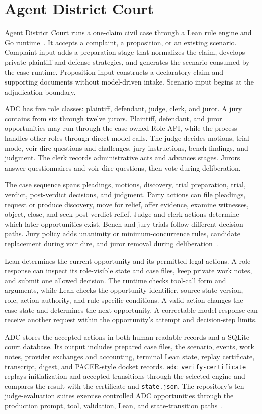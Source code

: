 \documentclass[11pt]{article}
\newcommand{\code}[1]{\texttt{#1}}
\begin{document}
\section{Agent District Court}

Agent District Court runs a one-claim civil case through a Lean rule engine and Go runtime~\cite{manuals}.  It accepts a complaint, a proposition, or an existing scenario.  Complaint input adds a preparation stage that normalizes the claim, develops private plaintiff and defense strategies, and generates the scenario consumed by the case runtime.  Proposition input constructs a declaratory claim and supporting documents without model-driven intake.  Scenario input begins at the adjudication boundary.

ADC has five role classes: plaintiff, defendant, judge, clerk, and juror.  A jury contains from six through twelve jurors.  Plaintiff, defendant, and juror opportunities may run through the case-owned Role API, while the process handles other roles through direct model calls.  The judge decides motions, trial mode, voir dire questions and challenges, jury instructions, bench findings, and judgment.  The clerk records administrative acts and advances stages.  Jurors answer questionnaires and voir dire questions, then vote during deliberation.

The case sequence spans pleadings, motions, discovery, trial preparation, trial, verdict, post-verdict decisions, and judgment.  Party actions can file pleadings, request or produce discovery, move for relief, offer evidence, examine witnesses, object, close, and seek post-verdict relief.  Judge and clerk actions determine which later opportunities exist.  Bench and jury trials follow different decision paths.  Jury policy adds unanimity or minimum-concurrence rules, candidate replacement during voir dire, and juror removal during deliberation~\cite{arcp}.

Lean determines the current opportunity and its permitted legal actions.  A role response can inspect its role-visible state and case files, keep private work notes, and submit one allowed decision.  The runtime checks tool-call form and arguments, while Lean checks the opportunity identifier, source-state version, role, action authority, and rule-specific conditions.  A valid action changes the case state and determines the next opportunity.  A correctable model response can receive another request within the opportunity's attempt and decision-step limits.

ADC stores the accepted actions in both human-readable records and a SQLite court database.  Its output includes prepared case files, the scenario, events, work notes, provider exchanges and accounting, terminal Lean state, replay certificate, transcript, digest, and PACER-style docket records.  \code{adc verify-certificate} replays initialization and accepted transitions through the selected engine and compares the result with the certificate and \code{state.json}.  The repository's ten judge-evaluation suites exercise controlled ADC opportunities through the production prompt, tool, validation, Lean, and state-transition paths~\cite{evalpaper}.
\end{document}
